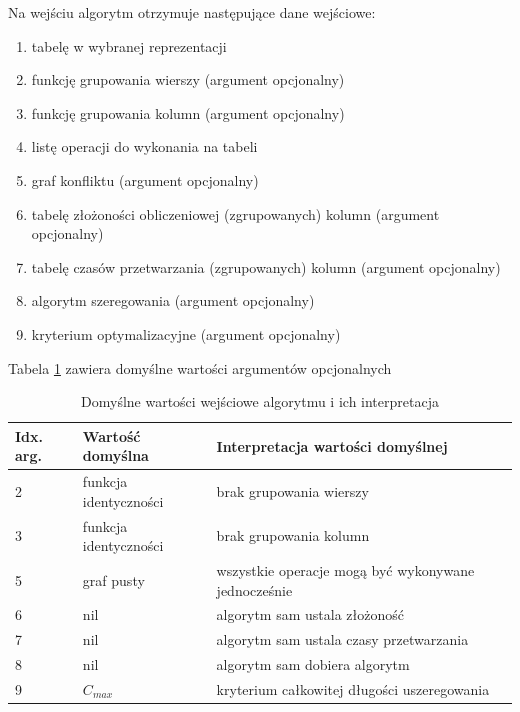 \documentclass[brudnopis]{xmgr}
\begin{document}
Na wejściu algorytm otrzymuje następujące dane wejściowe:

\begin{enumerate}
    \item tabelę w wybranej reprezentacji
    \item funkcję grupowania wierszy (argument opcjonalny)
    \item funkcję grupowania kolumn (argument opcjonalny)
    \item listę operacji do wykonania na tabeli
    \item graf konfliktu (argument opcjonalny)
    \item tabelę złożoności obliczeniowej (zgrupowanych) kolumn (argument opcjonalny)
    \item tabelę czasów przetwarzania (zgrupowanych) kolumn (argument opcjonalny)
    \item algorytm szeregowania (argument opcjonalny)
    \item kryterium optymalizacyjne (argument opcjonalny)
\end{enumerate}


Tabela \ref{tab:args-default} zawiera domyślne wartości argumentów opcjonalnych


\begin{table}[!tbh]
\begin{tabular}{|l|l|l|} \hline
Idx. arg. & Wartość domyślna & Interpretacja wartości domyślnej \\ \hline
2 & funkcja identyczności   & brak grupowania wierszy \\ \hline
3 & funkcja identyczności   & brak grupowania kolumn \\ \hline
5 & graf pusty              & wszystkie operacje mogą być wykonywane jednocześnie \\ \hline
6 & nil                     & algorytm sam ustala złożoność \\ \hline
7 & nil                     & algorytm sam ustala czasy przetwarzania \\ \hline
8 & nil                     & algorytm sam dobiera algorytm \\ \hline
9 & $C_{max}$               & kryterium całkowitej długości uszeregowania \\ \hline
\end{tabular}
\caption{Domyślne wartości wejściowe algorytmu i ich interpretacja\label{tab:args-default}}
\end{table}
\end{document}
